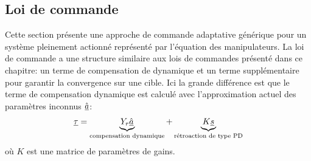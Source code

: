 \subsection{Loi de commande}
Cette section présente une approche de commande adaptative générique pour un système pleinement actionné représenté par l'équation des manipulateurs. La loi de commande a une structure similaire aux lois de commandes présenté dans ce chapitre: un terme de compensation de dynamique et un terme supplémentaire pour garantir la convergence sur une cible. Ici la grande différence est que le terme de compensation dynamique est calculé avec l'approximation actuel des paramètres inconnus $\underline{\hat{a}}$:
\begin{align}
\underline{\tau} = 
\underbrace{
Y_r \hat{\underline{a}}
}_{\text{compensation dynamique}}
+
\underbrace{
K \underline{s}
}_{\text{rétroaction de type PD}}
\end{align}
où $K$ est une matrice de paramètres de gains. 

